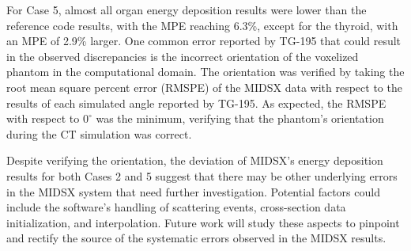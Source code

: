 \par For Case 5, almost all organ energy deposition results were lower than the reference code results, with the MPE reaching 6.3\%, except for the thyroid, with an MPE of 2.9\% larger. One common error reported by TG-195 that could result in the observed discrepancies is the incorrect orientation of the voxelized phantom in the computational domain. The orientation was verified by taking the root mean square percent error (RMSPE) of the MIDSX data with respect to the results of each simulated angle reported by TG-195. As expected, the RMSPE with respect to $0^\circ$ was the minimum, verifying that the phantom's orientation during the CT simulation was correct.

\par Despite verifying the orientation, the deviation of MIDSX's energy deposition results for both Cases 2 and 5 suggest that there may be other underlying errors in the MIDSX system that need further investigation. Potential factors could include the software's handling of scattering events, cross-section data initialization, and interpolation. Future work will study these aspects to pinpoint and rectify the source of the systematic errors observed in the MIDSX results.


